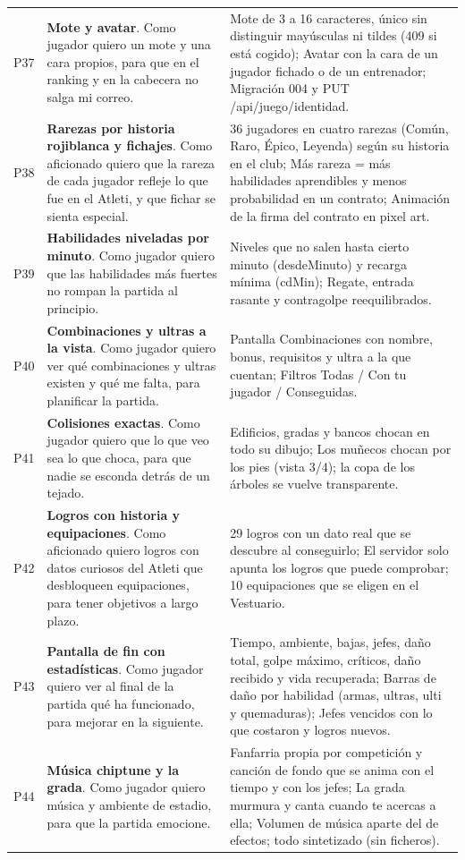 {\begin{longtable}{@{}L{0.8cm} L{6.4cm} L{6.6cm}@{}}
P37 & \textbf{Mote y avatar}. Como jugador quiero un mote y una cara propios, para que en el ranking y en la cabecera no salga mi correo. & Mote de 3 a 16 caracteres, único sin distinguir mayúsculas ni tildes (409 si está cogido); Avatar con la cara de un jugador fichado o de un entrenador; Migración 004 y PUT /api/juego/identidad. \\
P38 & \textbf{Rarezas por historia rojiblanca y fichajes}. Como aficionado quiero que la rareza de cada jugador refleje lo que fue en el Atleti, y que fichar se sienta especial. & 36 jugadores en cuatro rarezas (Común, Raro, Épico, Leyenda) según su historia en el club; Más rareza = más habilidades aprendibles y menos probabilidad en un contrato; Animación de la firma del contrato en pixel art. \\
P39 & \textbf{Habilidades niveladas por minuto}. Como jugador quiero que las habilidades más fuertes no rompan la partida al principio. & Niveles que no salen hasta cierto minuto (desdeMinuto) y recarga mínima (cdMin); Regate, entrada rasante y contragolpe reequilibrados. \\
P40 & \textbf{Combinaciones y ultras a la vista}. Como jugador quiero ver qué combinaciones y ultras existen y qué me falta, para planificar la partida. & Pantalla Combinaciones con nombre, bonus, requisitos y ultra a la que cuentan; Filtros Todas / Con tu jugador / Conseguidas. \\
P41 & \textbf{Colisiones exactas}. Como jugador quiero que lo que veo sea lo que choca, para que nadie se esconda detrás de un tejado. & Edificios, gradas y bancos chocan en todo su dibujo; Los muñecos chocan por los pies (vista 3/4); la copa de los árboles se vuelve transparente. \\
P42 & \textbf{Logros con historia y equipaciones}. Como aficionado quiero logros con datos curiosos del Atleti que desbloqueen equipaciones, para tener objetivos a largo plazo. & 29 logros con un dato real que se descubre al conseguirlo; El servidor solo apunta los logros que puede comprobar; 10 equipaciones que se eligen en el Vestuario. \\
P43 & \textbf{Pantalla de fin con estadísticas}. Como jugador quiero ver al final de la partida qué ha funcionado, para mejorar en la siguiente. & Tiempo, ambiente, bajas, jefes, daño total, golpe máximo, críticos, daño recibido y vida recuperada; Barras de daño por habilidad (armas, ultras, ulti y quemaduras); Jefes vencidos con lo que costaron y logros nuevos. \\
P44 & \textbf{Música chiptune y la grada}. Como jugador quiero música y ambiente de estadio, para que la partida emocione. & Fanfarria propia por competición y canción de fondo que se anima con el tiempo y con los jefes; La grada murmura y canta cuando te acercas a ella; Volumen de música aparte del de efectos; todo sintetizado (sin ficheros). \\

\end{longtable}}
